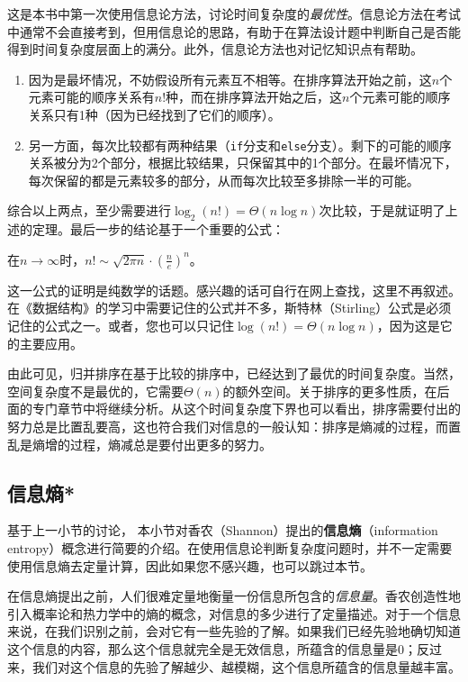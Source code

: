这是本书中第一次使用信息论方法，讨论时间复杂度的\textit{最优性}。信息论方法在考试中通常不会直接考到，但用信息论的思路，有助于在算法设计题中判断自己是否能得到时间复杂度层面上的满分。此外，信息论方法也对记忆知识点有帮助。

\begin{enumerate}
    \item 因为是最坏情况，不妨假设所有元素互不相等。在排序算法开始之前，这$n$个元素可能的顺序关系有$n!$种，而在排序算法开始之后，这$n$个元素可能的顺序关系只有1种（因为已经找到了它们的顺序）。
    \item 另一方面，每次比较都有两种结果（\lstinline{if}分支和\lstinline{else}分支）。剩下的可能的顺序关系被分为2个部分，根据比较结果，只保留其中的1个部分。在最坏情况下，每次保留的都是元素较多的部分，从而每次比较至多排除一半的可能。
\end{enumerate}

综合以上两点，至少需要进行$\log_2(n!)=\Theta(n\log n)$次比较，于是就证明了上述的定理。最后一步的结论基于一个重要的公式：

\begin{theorem}[斯特林公式]
    在$n\to\infty$时，$n!\sim \sqrt{2\pi n}\cdot \left(\frac ne\right)^n$。
\end{theorem}

这一公式的证明是纯数学的话题。感兴趣的话可自行在网上查找，这里不再叙述。
在《数据结构》的学习中需要记住的公式并不多，斯特林（Stirling）公式是必须记住的公式之一。或者，您也可以只记住$\log(n!)=\Theta(n\log n)$，因为这是它的主要应用。

由此可见，归并排序在基于比较的排序中，已经达到了最优的时间复杂度。当然，空间复杂度不是最优的，它需要$\Theta(n)$的额外空间。关于排序的更多性质，在后面的专门章节中将继续分析。从这个时间复杂度下界也可以看出，排序需要付出的努力总是比置乱要高，这也符合我们对信息的一般认知：排序是熵减的过程，而置乱是熵增的过程，熵减总是要付出更多的努力。

\subsection{信息熵*}
\label{vec:信息熵}
基于上一小节的讨论，
本小节对香农（Shannon）提出的\textbf{信息熵}（information entropy）概念进行简要的介绍。在使用信息论判断复杂度问题时，并不一定需要使用信息熵去定量计算，因此如果您不感兴趣，也可以跳过本节。

在信息熵提出之前，人们很难定量地衡量一份信息所包含的\textit{信息量}。香农创造性地引入概率论和热力学中的熵的概念，对信息的多少进行了定量描述。对于一个信息来说，在我们识别之前，会对它有一些先验的了解。如果我们已经先验地确切知道这个信息的内容，那么这个信息就完全是无效信息，所蕴含的信息量是0；反过来，我们对这个信息的先验了解越少、越模糊，这个信息所蕴含的信息量越丰富。


